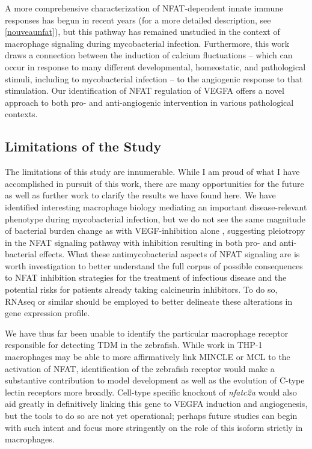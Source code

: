 A more comprehensive characterization of NFAT-dependent innate immune responses has begun in recent years \citep{Deerhake2021, Peuker2022, Poli2022} (for a more detailed description, see \autoref{nouveaunfat}), but this pathway has remained unstudied in the context of macrophage signaling during mycobacterial infection. Furthermore, this work draws a connection between the induction of calcium fluctuations -- which can occur in response to many different developmental, homeostatic, and pathological stimuli, including to mycobacterial infection \citep{Kusner2001, Jayachandran2007, Jayachandran2008, Matty2019, Malik2000} -- to the angiogenic response to that stimulation. Our identification of NFAT regulation of VEGFA offers a novel approach to both pro- and anti-angiogenic intervention in various pathological contexts.

\subsection{Limitations of the Study}

The limitations of this study are innumerable. While I am proud of what I have accomplished in pursuit of this work, there are many opportunities for the future as well as further work to clarify the results we have found here. We have identified interesting macrophage biology mediating an important disease-relevant phenotype during mycobacterial infection, but we do not see the same magnitude of bacterial burden change as with VEGF-inhibition alone \citep{Oehlers2015}, suggesting pleiotropy in the NFAT signaling pathway with inhibition resulting in both pro- and anti-bacterial effects. What these antimycobacterial aspects of NFAT signaling are is worth investigation to better understand the full corpus of possible consequences to NFAT inhibition strategies for the treatment of infectious disease and the potential risks for patients already taking calcineurin inhibitors. To do so, RNAseq or similar should be employed to better delineate these alterations in gene expression profile.

We have thus far been unable to identify the particular macrophage receptor responsible for detecting TDM in the zebrafish. While work in THP-1 macrophages may be able to more affirmatively link MINCLE or MCL to the activation of NFAT, identification of the zebrafish receptor would make a substantive contribution to model development as well as the evolution of C-type lectin receptors more broadly. Cell-type specific knockout of \textit{nfatc2a} would also aid greatly in definitively linking this gene to VEGFA induction and angiogenesis, but the tools to do so are not yet operational; perhaps future studies can begin with such intent and focus more stringently on the role of this isoform strictly in macrophages.

